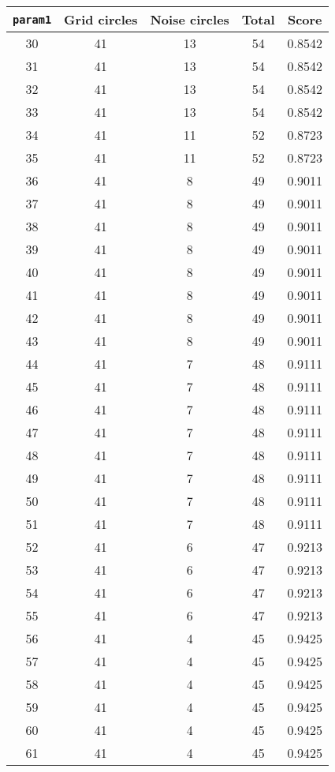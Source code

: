\documentclass[letterpaper, 12pt]{article}
\begin{document}
\begin{longtable}{|c|c|c|c|c|}
\hline
\textbf{\texttt{param1}} & \textbf{Grid circles} & \textbf{Noise circles} & \textbf{Total} & \textbf{Score} \\
\hline
30 & 41 & 13 & 54 & 0.8542 \\
\hline
31 & 41 & 13 & 54 & 0.8542 \\
\hline
32 & 41 & 13 & 54 & 0.8542 \\
\hline
33 & 41 & 13 & 54 & 0.8542 \\
\hline
34 & 41 & 11 & 52 & 0.8723 \\
\hline
35 & 41 & 11 & 52 & 0.8723 \\
\hline
36 & 41 & 8 & 49 & 0.9011 \\
\hline
37 & 41 & 8 & 49 & 0.9011 \\
\hline
38 & 41 & 8 & 49 & 0.9011 \\
\hline
39 & 41 & 8 & 49 & 0.9011 \\
\hline
40 & 41 & 8 & 49 & 0.9011 \\
\hline
41 & 41 & 8 & 49 & 0.9011 \\
\hline
42 & 41 & 8 & 49 & 0.9011 \\
\hline
43 & 41 & 8 & 49 & 0.9011 \\
\hline
44 & 41 & 7 & 48 & 0.9111 \\
\hline
45 & 41 & 7 & 48 & 0.9111 \\
\hline
46 & 41 & 7 & 48 & 0.9111 \\
\hline
47 & 41 & 7 & 48 & 0.9111 \\
\hline
48 & 41 & 7 & 48 & 0.9111 \\
\hline
49 & 41 & 7 & 48 & 0.9111 \\
\hline
50 & 41 & 7 & 48 & 0.9111 \\
\hline
51 & 41 & 7 & 48 & 0.9111 \\
\hline
52 & 41 & 6 & 47 & 0.9213 \\
\hline
53 & 41 & 6 & 47 & 0.9213 \\
\hline
54 & 41 & 6 & 47 & 0.9213 \\
\hline
55 & 41 & 6 & 47 & 0.9213 \\
\hline
56 & 41 & 4 & 45 & 0.9425 \\
\hline
57 & 41 & 4 & 45 & 0.9425 \\
\hline
58 & 41 & 4 & 45 & 0.9425 \\
\hline
59 & 41 & 4 & 45 & 0.9425 \\
\hline
60 & 41 & 4 & 45 & 0.9425 \\
\hline
61 & 41 & 4 & 45 & 0.9425 \\

\end{longtable}
\end{document}
